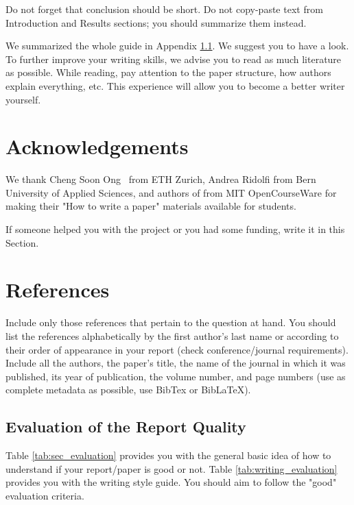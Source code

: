 \documentclass[10pt,conference,compsocconf]{IEEEtran}
\begin{document}
Do not forget that conclusion should be short. Do not copy-paste text from Introduction and Results sections; you should summarize them instead.

We summarized the whole guide in Appendix \ref{sec:evaluation}. We suggest you to have a look. To further improve your writing skills, we advise you to read as much literature as possible. While reading, pay attention to the paper structure, how authors explain everything, etc. This experience will allow you to become a better writer yourself.

\section{Acknowledgements}\label{sec:acknowledgements}
We thank Cheng Soon Ong~\cite{ethz} from ETH Zurich, Andrea Ridolfi from Bern University of Applied Sciences, and authors of \cite{mitGuidelinesWriting} from MIT OpenCourseWare for making their "How to write a paper" materials available for students.

 If someone helped you with the project or you had some funding, write it in this Section.

\section*{References}
Include only those references that pertain to the question at hand. You should list the references alphabetically by the first author’s last name or according to their order of appearance in your report (check conference/journal requirements). Include all the authors, the paper’s title, the name of the journal in which it was published, its year of publication, the volume number, and page numbers (use as complete metadata as possible, use BibTex or BibLaTeX).




\appendix
\subsection{Evaluation of the Report Quality}\label{sec:evaluation}
Table \ref{tab:sec_evaluation} provides you with the general basic idea of how to understand if your report/paper is good or not. Table \ref{tab:writing_evaluation} provides you with the writing style guide. You should aim to follow the "good" evaluation criteria.
\end{document}
